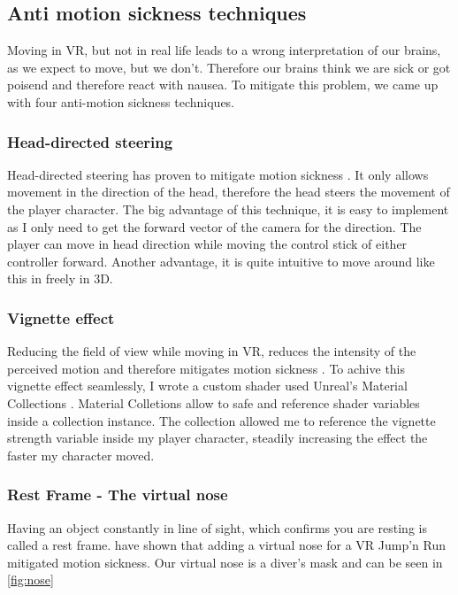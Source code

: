 \documentclass[letterpaper, 10 pt, conference]{ieeeconf}  %
\begin{document}
\subsection{Anti motion sickness techniques}

Moving in VR, but not in real life leads to a wrong interpretation of our brains, as we expect to move, but we don't.
Therefore our brains think we are sick or got poisend and therefore react with nausea.
To mitigate this problem, we came up with four anti-motion sickness techniques.

\subsubsection{Head-directed steering}

Head-directed steering has proven to mitigate motion sickness \cite{jerald2017vr}.
It only allows movement in the direction of the head, therefore the head steers the movement of the player character.
The big advantage of this technique, it is easy to implement as I only need to get the forward vector of the camera for the direction.
The player can move in head direction while moving the control stick of either controller forward.
Another advantage, it is quite intuitive to move around like this in freely in 3D.

\subsubsection{Vignette effect}

Reducing the field of view while moving in VR, reduces the intensity of the perceived motion and therefore mitigates motion sickness \cite{basting2017effectiveness}.
To achive this vignette effect seamlessly, I wrote a custom shader used Unreal's Material Collections \cite{collections}.
Material Colletions allow to safe and reference shader variables inside a collection instance. 
The collection allowed me to reference the vignette strength variable inside my player character, steadily increasing the effect the faster my character moved. 

\subsubsection {Rest Frame - The virtual nose}

Having an object constantly in line of sight, which confirms you are resting is called a rest frame.
 \parencite{wienrich2018virtual} have shown that adding a virtual nose for a VR Jump'n Run mitigated motion sickness.
 Our virtual nose is a diver's mask and can be seen in \ref{fig:nose}
\end{document}
